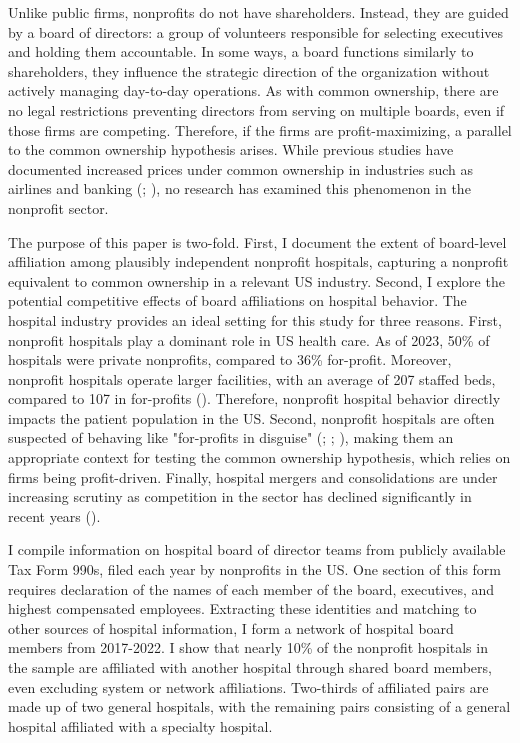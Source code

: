 \documentclass[12pt]{article}
\begin{document}
    Unlike public firms, nonprofits do not have shareholders. Instead, they are guided by a board of directors: a group of volunteers responsible for selecting executives and holding them accountable. In some ways, a board functions similarly to shareholders, they influence the strategic direction of the organization without actively managing day-to-day operations. As with common ownership, there are no legal restrictions preventing directors from serving on multiple boards, even if those firms are competing. Therefore, if the firms are profit-maximizing, a parallel to the common ownership hypothesis arises. While previous studies have documented increased prices under common ownership in industries such as airlines and banking (\cite{azar2018anticompetitive}; \cite{azar2022ultimate}), no research has examined this phenomenon in the nonprofit sector. 
    
    The purpose of this paper is two-fold. First, I document the extent of board-level affiliation among plausibly independent nonprofit hospitals, capturing a nonprofit equivalent to common ownership in a relevant US industry. Second, I explore the potential competitive effects of board affiliations on hospital behavior. The hospital industry provides an ideal setting for this study for three reasons. First, nonprofit hospitals play a dominant role in US health care. As of 2023, 50\% of hospitals were private nonprofits, compared to 36\% for-profit. Moreover, nonprofit hospitals operate larger facilities, with an average of 207 staffed beds, compared to 107 in for-profits (\cite{ASPE_2023}). Therefore, nonprofit hospital behavior directly impacts the patient population in the US. Second, nonprofit hospitals are often suspected of behaving like "for-profits in disguise" (\cite{nicholson2000measuring}; \cite{bai2021analysis}; \cite{bruch2021charity}), making them an appropriate context for testing the common ownership hypothesis, which relies on firms being profit-driven. Finally, hospital mergers and consolidations are under increasing scrutiny as competition in the sector has declined significantly in recent years (\cite{levinson2024ten}). 

    I compile information on hospital board of director teams from publicly available Tax Form 990s, filed each year by nonprofits in the US. One section of this form requires declaration of the names of each member of the board, executives, and highest compensated employees. Extracting these identities and matching to other sources of hospital information, I form a network of hospital board members from 2017-2022. I show that nearly 10\% of the nonprofit hospitals in the sample are affiliated with another hospital through shared board members, even excluding system or network affiliations. Two-thirds of affiliated pairs are made up of two general hospitals, with the remaining pairs consisting of a general hospital affiliated with a specialty hospital. 
\end{document}

